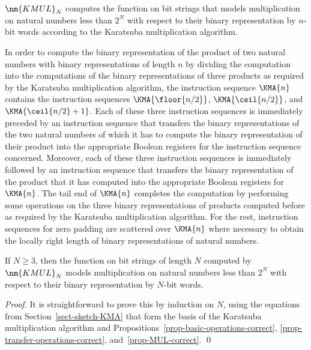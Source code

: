 \documentclass{llncs}
\begin{document}
$\nm{KMUL}_N$ computes the function on bit strings that models 
multiplication on natural numbers less than $2^N$ with respect to their 
binary representation by $n$-bit words according to the Karatsuba 
multiplication algorithm.

In order to compute the binary representation of the product of two 
natural numbers with binary representations of length $n$ by dividing 
the computation into the computations of the binary representations 
of three products as required by the Karatsuba multiplication algorithm, 
the instruction sequence $\KMA{n}$ contains the instruction sequences 
$\KMA{\floor{n/2}}$, $\KMA{\ceil{n/2}}$, and $\KMA{\ceil{n/2} + 1}$.
Each of these three instruction sequences is immediately preceded by an 
instruction sequence that transfers the binary representations of the 
two natural numbers of which it has to compute the binary representation 
of their product into the appropriate Boolean registers for the 
instruction sequence concerned.
Moreover, each of these three instruction sequences is immediately 
followed by an instruction sequence that transfers the binary 
representation of the product that it has computed into the appropriate 
Boolean registers for $\KMA{n}$.
The tail end of $\KMA{n}$ completes the computation by performing some
operations on the three binary representations of products computed 
before as required by the Karatsuba multiplication algorithm.
For the rest, instruction sequences for zero padding are scattered over 
$\KMA{n}$ where necessary to obtain the locally right length of binary 
representations of natural numbers.

\begin{proposition}
\label{prop-KMUL-correct}
If $N \geq 3$, then the function on bit strings of length $N$ computed 
by $\nm{KMUL}_N$ models multiplication on natural numbers less than 
$2^N$ with respect to their binary representation by $N$-bit words.
\end{proposition}
\begin{proof}
It is straightforward to prove this by induction on $N$, using the 
equations from Section~\ref{sect-sketch-KMA} that form the basis of the 
Karatsuba multiplication algorithm and
Propositions~\ref{prop-basic-operations-correct}, 
\ref{prop-transfer-operations-correct}, and~\ref{prop-MUL-correct}.
\qed
\end{proof}
\end{document}
